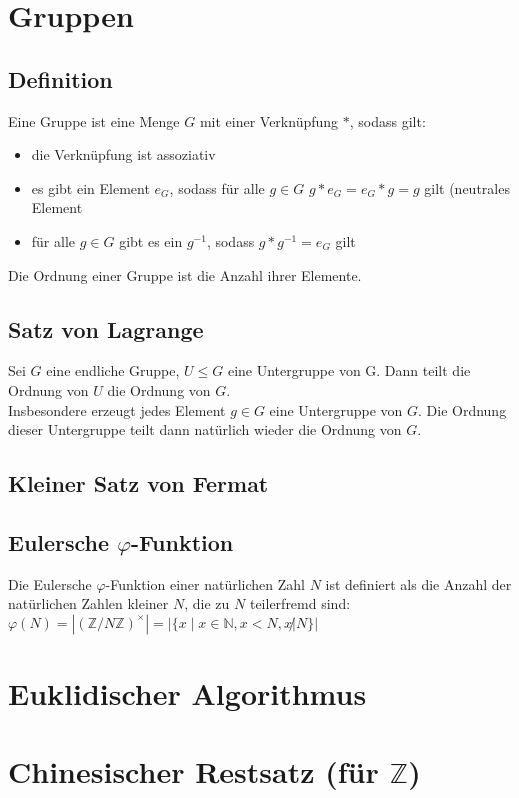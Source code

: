 \documentclass[a4paper,twoside,DIV15,BCOR12mm]{scrbook}
\begin{document}
\section{Gruppen}

\subsection{Definition}

Eine Gruppe ist eine Menge $G$ mit einer Verknüpfung $*$, sodass gilt:

\begin{itemize}
	\item die Verknüpfung ist assoziativ
	\item es gibt ein Element $e_G$, sodass für alle $g \in G$ $g * e_G = e_G * g =g$ gilt (neutrales Element
	\item für alle $g \in G$ gibt es ein $g^{-1}$, sodass $g * g^{-1} = e_G$ gilt
\end{itemize}

Die Ordnung einer Gruppe ist die Anzahl ihrer Elemente.

\subsection{Satz von Lagrange}

Sei $G$ eine endliche Gruppe, $U \leq G$ eine Untergruppe von G. Dann teilt die Ordnung von $U$ die Ordnung von $G$.\\

Insbesondere erzeugt jedes Element $g \in G$ eine Untergruppe von $G$. Die Ordnung dieser Untergruppe teilt dann natürlich wieder die Ordnung von $G$.

\subsection{Kleiner Satz von Fermat}

\subsection{Eulersche $\varphi$-Funktion}

Die Eulersche $\varphi$-Funktion einer natürlichen Zahl $N$ ist definiert als die Anzahl der natürlichen Zahlen kleiner $N$, die zu $N$ teilerfremd sind: $\varphi(N) = \left|(\mathbb{Z}/N\mathbb{Z})^\times \right| = \left| \{ x \mid x \in \mathbb{N}, x < N, x \not| N \} \right|$

\section{Euklidischer Algorithmus}

\section{Chinesischer Restsatz (für $\mathbb{Z}$)}

\appendix

\renewcommand{\indexname}{Stichwortverzeichnis}
\printindex

%
\end{document}
